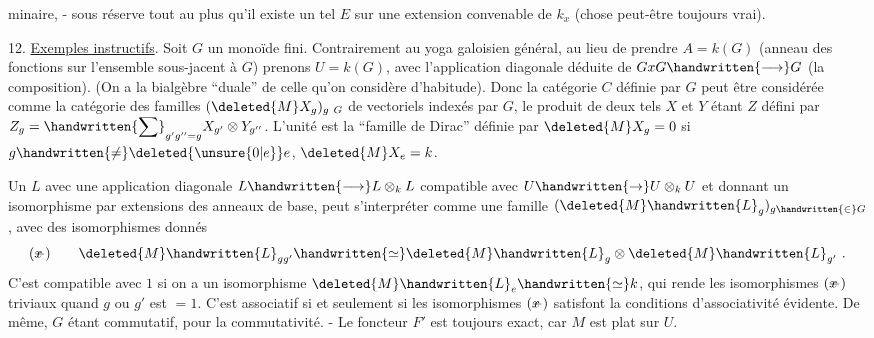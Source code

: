 %
minaire, - sous réserve tout au plus qu'il existe un tel $E$ sur une extension convenable de $k_x$ (chose peut-être toujours vrai).

12. \uline{Exemples instructifs}. Soit $G$ un monoïde fini. Contrairement au yoga galoisien général, au lieu de prendre $A=k(G)$ (anneau des fonctions sur l'ensemble sous-jacent à $G$) prenons $U=k(G)$, avec l'application diagonale déduite de $GxG\handwritten{\longrightarrow}G$ (la composition). (On a la bialgèbre ``duale'' de celle qu'on considère d'habitude). Donc la catégorie $C$ définie par $G$  peut être considérée comme la catégorie des familles $(\deleted{M}X_g)_{g\ G}$ de vectoriels indexés par $G$, le produit de deux tels $X$ et $Y$ étant $Z$ défini par $Z_g=\handwritten{\displaystyle\sum}_{g'g''=g}X_{g'}\otimes Y_{g''}$. L'unité est la ``famille de Dirac'' définie par $\deleted{M}X_g=0$ si $g\handwritten{\ne}\deleted{\unsure{0|e}}e$, $\deleted{M}X_e=k$.

Un $L$ avec une application diagonale $L\handwritten{\longrightarrow}L\otimes_k L$ compatible avec $U\handwritten{\to}U\otimes_k U$ et donnant un isomorphisme par extensions des anneaux de base, peut s'interpréter comme une famille $(\deleted{M}\handwritten{L}_g)_{g\handwritten{\in}G}$, avec des isomorphismes donnés
\[
(\rlap{\(x\)}-)\qquad \deleted{M}\handwritten{L}_{gg'}\handwritten{\simeq}\deleted{M}\handwritten{L}_g\otimes\deleted{M}\handwritten{L}_{g'}\ .
\]
C'est compatible avec $1$ si on a un isomorphisme\inserted{\handwritten{\unsure{(*+)|(**)}}} $\deleted{M}\handwritten{L}_e\handwritten{\simeq}k$, qui rende les isomorphismes $(\rlap{\(x\)}-)$ triviaux quand  $g$ ou $g'$ est $=1$. C'est associatif si et seulement si les isomorphismes $(\rlap{\(x\)}-)$ satisfont la  conditions d'associativité évidente. De même, $G$ étant commutatif, pour la commutativité. - Le foncteur $F'$ est toujours exact, car $M$ est plat sur $U$.

